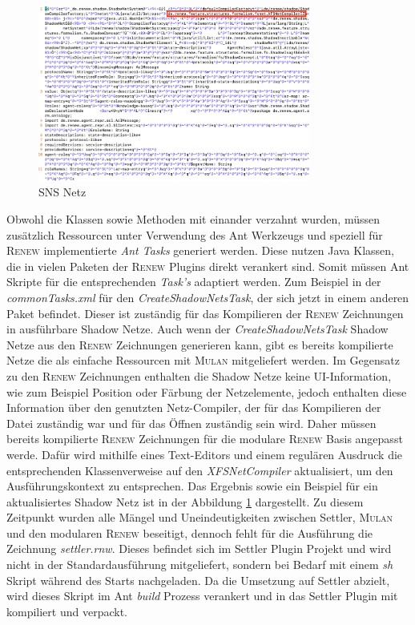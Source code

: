 	\begin{figure}[h!]
	  \centering
	  \includegraphics[width=0.8\textwidth]{material/images/shadownet.png}
	  \caption{SNS Netz}
	  \label{fig:sns_netz}
	\end{figure}

	Obwohl die Klassen sowie Methoden mit einander verzahnt wurden, müssen zusätzlich Ressourcen unter Verwendung des Ant Werkzeugs und speziell für \textsc{Renew} implementierte \textit{Ant Tasks} generiert werden. Diese nutzen Java Klassen, die in vielen Paketen der \textsc{Renew} Plugins direkt verankert sind. Somit müssen Ant Skripte für die entsprechenden \textit{Task's} adaptiert werden. Zum Beispiel in der \textit{commonTasks.xml} für den \textit{CreateShadowNetsTask}, der sich jetzt in einem anderen Paket befindet. Dieser ist zuständig für das Kompilieren der \textsc{Renew} Zeichnungen in ausführbare Shadow Netze. Auch wenn der \textit{CreateShadowNetsTask} Shadow Netze aus den \textsc{Renew} Zeichnungen generieren kann, gibt es bereits kompilierte Netze die als einfache Ressourcen mit \textsc{Mulan} mitgeliefert werden. \newline
	Im Gegensatz zu den \textsc{Renew} Zeichnungen enthalten die Shadow Netze keine UI-Information, wie zum Beispiel Position oder Färbung der Netzelemente, jedoch enthalten diese Information über den genutzten Netz-Compiler, der für das Kompilieren der Datei zuständig war und für das Öffnen zuständig sein wird. Daher müssen bereits kompilierte \textsc{Renew} Zeichnungen für die modulare \textsc{Renew} Basis angepasst werde. Dafür wird mithilfe eines Text-Editors und einem regulären Ausdruck die entsprechenden Klassenverweise auf den \textit{XFSNetCompiler} aktualisiert, um den Ausführungskontext zu entsprechen. \newline
	Das Ergebnis sowie ein Beispiel für ein aktualisiertes Shadow Netz ist in der Abbildung \ref{fig:sns_netz} dargestellt. \bigbreak
	Zu diesem Zeitpunkt wurden alle Mängel und Uneindeutigkeiten zwischen Settler, \textsc{Mulan} und den modularen \textsc{Renew} beseitigt, dennoch fehlt für die Ausführung die Zeichnung \textit{settler.rnw}. Dieses befindet sich im Settler Plugin Projekt und wird nicht in der Standardausführung mitgeliefert, sondern bei Bedarf mit einem \textit{sh} Skript während des Starts nachgeladen. \newline
	Da die Umsetzung auf Settler abzielt, wird dieses Skript im Ant \textit{build} Prozess verankert und in das Settler Plugin mit kompiliert und verpackt. \newline

